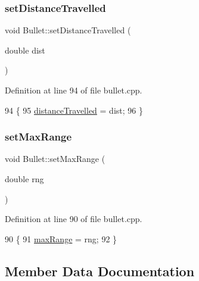 \subsubsection{\texorpdfstring{set\+Distance\+Travelled}{setDistanceTravelled}}
{\footnotesize\ttfamily void Bullet\+::set\+Distance\+Travelled (\begin{DoxyParamCaption}\item[{double}]{dist }\end{DoxyParamCaption})\hspace{0.3cm}{\ttfamily [slot]}}



Definition at line 94 of file bullet.\+cpp.


\begin{DoxyCode}
94                                             \{
95     \hyperlink{class_bullet_afe194c1b7e495d0c17492396595202e1}{distanceTravelled} = dist;
96 \}
\end{DoxyCode}
\mbox{\label{class_bullet_a070852a34b912c9379338df18e32cf91}} 
\subsubsection{\texorpdfstring{set\+Max\+Range}{setMaxRange}}
{\footnotesize\ttfamily void Bullet\+::set\+Max\+Range (\begin{DoxyParamCaption}\item[{double}]{rng }\end{DoxyParamCaption})\hspace{0.3cm}{\ttfamily [slot]}}



Definition at line 90 of file bullet.\+cpp.


\begin{DoxyCode}
90                                   \{
91     \hyperlink{class_bullet_ae7c4fadfcc22643cb271622fe8bb2eb0}{maxRange} = rng;
92 \}
\end{DoxyCode}


\subsection{Member Data Documentation}
\mbox{\label{class_bullet_a733d2ebbf9143c9ca68d3eb7e14121d0}} 
